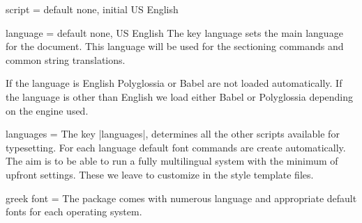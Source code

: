 \begin{docKey}[phd]{script} { = } {default none, initial US English}{}
\end{docKey}

\begin{docKey}{language}{ =}  {default none, US English}
The key language sets the main language for the document. This language will be used for the sectioning commands and common string translations.

If the language is English Polyglossia or Babel are not loaded automatically. If the language is other than English we load either Babel or Polyglossia depending on the engine used.
\end{docKey}


\begin{docKey}{languages}{ = }  {}
The key |languages|, determines all the other scripts available for typesetting. For each language default font commands are create automatically. The aim is to be able to run a fully multilingual system with the minimum of upfront settings. These we leave to customize in the style template files.
\end{docKey}

\begin{docKey}{greek font}{ = }  {}
The package comes with numerous language and appropriate default fonts
for each operating system. 
\end{docKey}












